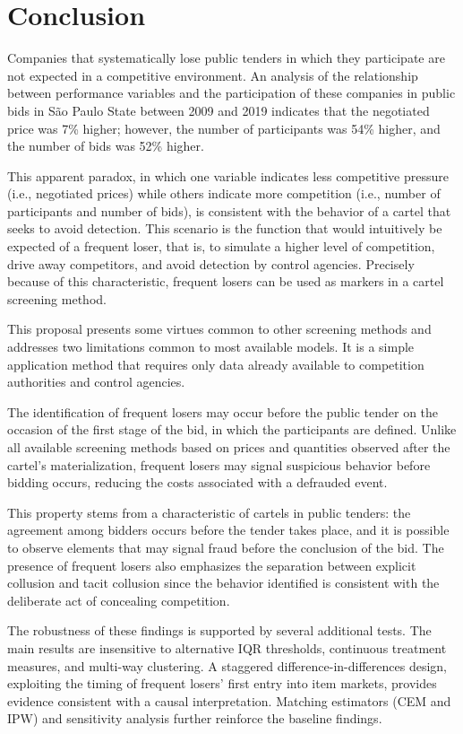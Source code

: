 \section{Conclusion}
\label{sec:conclusion}

Companies that systematically lose public tenders in which they participate are not expected in a competitive environment. An analysis of the relationship between performance variables and the participation of these companies in public bids in S\~{a}o Paulo State between 2009 and 2019 indicates that the negotiated price was 7\% higher; however, the number of participants was 54\% higher, and the number of bids was 52\% higher.

This apparent paradox, in which one variable indicates less competitive pressure (i.e., negotiated prices) while others indicate more competition (i.e., number of participants and number of bids), is consistent with the behavior of a cartel that seeks to avoid detection. This scenario is the function that would intuitively be expected of a frequent loser, that is, to simulate a higher level of competition, drive away competitors, and avoid detection by control agencies. Precisely because of this characteristic, frequent losers can be used as markers in a cartel screening method.

This proposal presents some virtues common to other screening methods and addresses two limitations common to most available models. It is a simple application method that requires only data already available to competition authorities and control agencies.

The identification of frequent losers may occur before the public tender on the occasion of the first stage of the bid, in which the participants are defined. Unlike all available screening methods based on prices and quantities observed after the cartel's materialization, frequent losers may signal suspicious behavior before bidding occurs, reducing the costs associated with a defrauded event.

This property stems from a characteristic of cartels in public tenders: the agreement among bidders occurs before the tender takes place, and it is possible to observe elements that may signal fraud before the conclusion of the bid. The presence of frequent losers also emphasizes the separation between explicit collusion and tacit collusion since the behavior identified is consistent with the deliberate act of concealing competition.

The robustness of these findings is supported by several additional tests. The main results are insensitive to alternative IQR thresholds, continuous treatment measures, and multi-way clustering. A staggered difference-in-differences design, exploiting the timing of frequent losers' first entry into item markets, provides evidence consistent with a causal interpretation. Matching estimators (CEM and IPW) and sensitivity analysis further reinforce the baseline findings.

